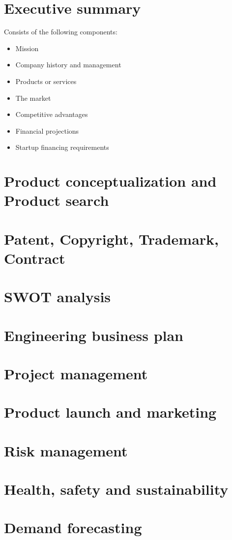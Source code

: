\documentclass{article}
\begin{document}
\section{Executive summary}
Consists of the following components:
\begin{itemize}
      \item Mission
      \item Company history and management
      \item Products or services
      \item The market
      \item Competitive advantages
      \item Financial projections
      \item Startup financing requirements
\end{itemize}

\section{Product conceptualization and Product search}
\section{Patent, Copyright, Trademark, Contract}
\section{SWOT analysis}
\section{Engineering business plan}
\section{Project management}
\section{Product launch and marketing}
\section{Risk management}
\section{Health, safety and sustainability}
\section{Demand forecasting}
\end{document}
